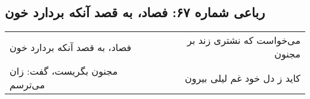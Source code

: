 \begin{center}
\section*{رباعی شماره ۶۷: فصاد، به قصد آنکه بردارد خون}
\label{sec:067}
\begin{longtable}{l p{0.5cm} r}
فصاد، به قصد آنکه بردارد خون
&&
می‌خواست که نشتری زند بر مجنون
\\
مجنون بگریست، گفت: زان می‌ترسم
&&
کاید ز دل خود غم لیلی بیرون
\\
\end{longtable}
\end{center}
